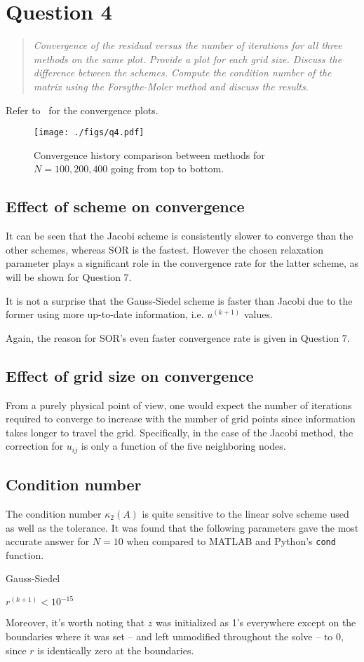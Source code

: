 \documentclass{SelimArticle}
\begin{document}
\newpage
\section{Question 4}
\begin{quote}
\textit{
    Convergence of the residual versus the number of iterations for all three
    methods on the same plot. Provide a plot for each grid size. Discuss the
    difference between the schemes.  Compute the condition number of the
    matrix using the Forsythe-Moler method and discuss the results.
}
\end{quote}
Refer to~ for the convergence plots.

\begin{figure}
    \centering
    \texttt{[image: ./figs/q4.pdf]}
    \caption{Convergence history comparison between methods for $N = 100, 200, 400$  going from top to bottom.}\label{fig:q4}
\end{figure}
\subsection{Effect of scheme on convergence}
It can be seen that the Jacobi scheme is consistently slower to converge than the other schemes, whereas
SOR is the fastest. However the chosen relaxation parameter plays a significant role in the convergence rate
for the latter scheme, as will be shown for Question 7.

It is not a surprise that the Gauss-Siedel scheme is faster than Jacobi due to the former using
more up-to-date information, i.e. $u^{(k+1)}$ values.

Again, the reason for SOR's even faster convergence rate is given in Question 7.

\subsection{Effect of grid size on convergence}
From a purely physical point of view, one would expect the number of iterations required to converge
to increase with the number of grid points since information takes longer to travel the grid. Specifically,
in the case of the Jacobi method, the correction for $u_{ij}$ is only a function of the five neighboring
nodes.

\subsection{Condition number}
The condition number $\kappa_2(A)$ is quite sensitive to the linear solve scheme used as well as the tolerance.
It was found that the following parameters gave the most accurate answer for $N=10$ when compared
to MATLAB and Python's \texttt{cond} function.
\begin{description}[noitemsep]
    \item[Scheme:] Gauss-Siedel
    \item[Convergence Criteria:] $r^{(k+1)} < 10^{-15}$
\end{description}
Moreover, it's worth noting that $z$ was initialized as 1's everywhere except on the boundaries where it was set -- and
left unmodified throughout the solve -- to 0, since $r$ is identically zero at the boundaries.
\end{document}
